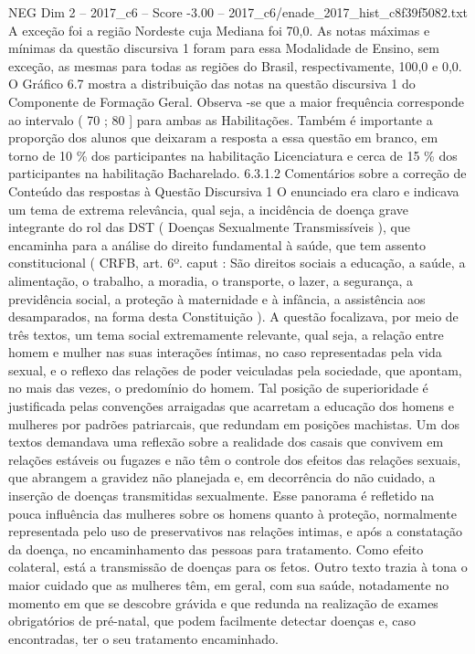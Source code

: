 \begin{textsample}{NEG Dim 2 – 2017\_c6 – Score -3.00 – 2017\_c6/enade\_2017\_hist\_c8f39f5082.txt}
A exceção foi a região Nordeste cuja Mediana foi 70,0.
As notas máximas e mínimas da questão discursiva 1 foram para essa Modalidade de Ensino, sem exceção, as mesmas para todas as regiões do Brasil, respectivamente, 100,0 e 0,0.
O Gráfico 6.7 mostra a distribuição das notas na questão discursiva 1 do Componente de Formação Geral.
Observa -se que a maior frequência corresponde ao intervalo ( 70 ; 80 ] para ambas as Habilitações.
Também é importante a proporção dos alunos que deixaram a resposta a essa questão em branco, em torno de 10 \% dos participantes na habilitação Licenciatura e cerca de 15 \% dos participantes na habilitação Bacharelado. 6.3.1.2 Comentários sobre a correção de Conteúdo das respostas à Questão Discursiva 1 O enunciado era claro e indicava um tema de extrema relevância, qual seja, a incidência de doença grave integrante do rol das DST ( Doenças Sexualmente Transmissíveis ), que encaminha para a análise do direito fundamental à saúde, que tem assento constitucional ( CRFB, art. 6º. caput : São direitos sociais a educação, a saúde, a alimentação, o trabalho, a moradia, o transporte, o lazer, a segurança, a previdência social, a proteção à maternidade e à infância, a assistência aos desamparados, na forma desta Constituição ).
A questão focalizava, por meio de três textos, um tema social extremamente relevante, qual seja, a relação entre homem e mulher nas suas interações íntimas, no caso representadas pela vida sexual, e o reflexo das relações de poder veiculadas pela sociedade, que apontam, no mais das vezes, o predomínio do homem.
Tal posição de superioridade é justificada pelas convenções arraigadas que acarretam a educação dos homens e mulheres por padrões patriarcais, que redundam em posições machistas.
Um dos textos demandava uma reflexão sobre a realidade dos casais que convivem em relações estáveis ou fugazes e não têm o controle dos efeitos das relações sexuais, que abrangem a gravidez não planejada e, em decorrência do não cuidado, a inserção de doenças transmitidas sexualmente.
Esse panorama é refletido na pouca influência das mulheres sobre os homens quanto à proteção, normalmente representada pelo uso de preservativos nas relações intimas, e após a constatação da doença, no encaminhamento das pessoas para tratamento.
Como efeito colateral, está a transmissão de doenças para os fetos.
Outro texto trazia à tona o maior cuidado que as mulheres têm, em geral, com sua saúde, notadamente no momento em que se descobre grávida e que redunda na realização de exames obrigatórios de pré-natal, que podem facilmente detectar doenças e, caso encontradas, ter o seu tratamento encaminhado.

\end{textsample}
